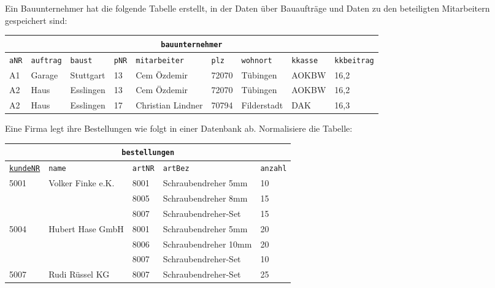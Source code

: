 \begin{Exercise}[title=Normalisiere folgende Tabelle und markiere die Primärschlüssel in deinem Ergebnis., label=Normal1]
	Ein Bauunternehmer hat die folgende Tabelle erstellt, in der Daten über Bauaufträge und Daten zu den beteiligten Mitarbeitern gespeichert sind:\\
	\begin{tabular}{lllllllll}
		\multicolumn{9}{c}{\lstinline!bauunternehmer!}\\
		\hline
		\lstinline!aNR!&\lstinline!auftrag!&\lstinline!baust!&\lstinline!pNR!&\lstinline!mitarbeiter!&\lstinline!plz!&\lstinline!wohnort!&\lstinline!kkasse!&\lstinline!kkbeitrag!\\
		\hline
		A1&Garage&Stuttgart&13&Cem Özdemir&72070&Tübingen&AOKBW&16,2\\
		A2&Haus&Esslingen&13&Cem Özdemir&72070&Tübingen&AOKBW&16,2\\
		A2&Haus&Esslingen&17&Christian Lindner&70794&Filderstadt&DAK&16,3\\
	\end{tabular}
\end{Exercise}
\begin{Exercise}[title=Normalisiere folgende Tabelle und markiere die Primärschlüssel in deinem Ergebnis., label=Normal2]
	Eine Firma legt ihre Bestellungen wie folgt in einer Datenbank ab. Normalisiere die Tabelle:\\
	\begin{tabular}{lllll}
		\multicolumn{5}{c}{\lstinline!bestellungen!}\\
		\hline
		\underline{\lstinline!kundeNR!}&\lstinline!name!&\lstinline!artNR!&\lstinline!artBez!&\lstinline!anzahl!\\
		\hline
		\multirow{3}{*}{5001}&\multirow{3}{*}{Volker Finke e.K.}&8001&Schraubendreher 5mm&10\\
		&&8005&Schraubendreher 8mm&15\\
		&&8007&Schraubendreher-Set&15\\
		\hline
		\multirow{3}{*}{5004}&\multirow{3}{*}{Hubert Hase GmbH}&8001&Schraubendreher 5mm&20\\
		&&8006&Schraubendreher 10mm&20\\
		&&8007&Schraubendreher-Set&10\\
		\hline
		5007&Rudi Rüssel KG&8007&Schraubendreher-Set&25\\
	\end{tabular}
\end{Exercise}
